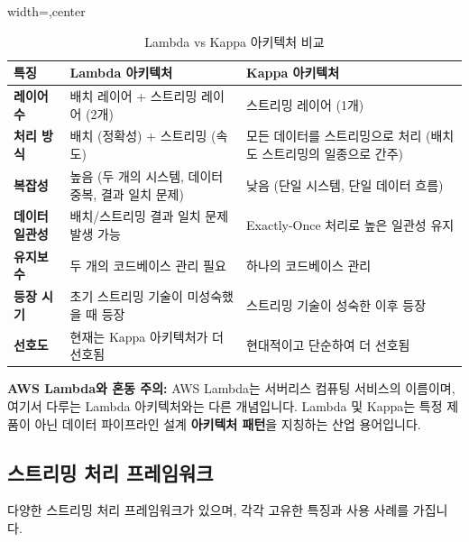 \documentclass[11pt,a4paper]{article}
\begin{document}
\begin{table}[htbp]
\centering
\caption{Lambda vs Kappa 아키텍처 비교}
\label{tab:lambda_vs_kappa}
\begin{adjustbox}{width=\textwidth,center}
\begin{tabular}{lll}
\toprule
\textbf{특징} & \textbf{Lambda 아키텍처} & \textbf{Kappa 아키텍처} \\
\midrule
\textbf{레이어 수} & 배치 레이어 + 스트리밍 레이어 (2개) & 스트리밍 레이어 (1개) \\
\textbf{처리 방식} & 배치 (정확성) + 스트리밍 (속도) & 모든 데이터를 스트리밍으로 처리 (배치도 스트리밍의 일종으로 간주) \\
\textbf{복잡성} & 높음 (두 개의 시스템, 데이터 중복, 결과 일치 문제) & 낮음 (단일 시스템, 단일 데이터 흐름) \\
\textbf{데이터 일관성} & 배치/스트리밍 결과 일치 문제 발생 가능 & Exactly-Once 처리로 높은 일관성 유지 \\
\textbf{유지보수} & 두 개의 코드베이스 관리 필요 & 하나의 코드베이스 관리 \\
\textbf{등장 시기} & 초기 스트리밍 기술이 미성숙했을 때 등장 & 스트리밍 기술이 성숙한 이후 등장 \\
\textbf{선호도} & 현재는 Kappa 아키텍처가 더 선호됨 & 현대적이고 단순하여 더 선호됨 \\
\bottomrule
\end{tabular}
\end{adjustbox}
\end{table}

\begin{warningbox}
\textbf{AWS Lambda와 혼동 주의:} AWS Lambda는 서버리스 컴퓨팅 서비스의 이름이며, 여기서 다루는 Lambda 아키텍처와는 다른 개념입니다. Lambda 및 Kappa는 특정 제품이 아닌 데이터 파이프라인 설계 \textbf{아키텍처 패턴}을 지칭하는 산업 용어입니다.
\end{warningbox}

\subsection{스트리밍 처리 프레임워크}

다양한 스트리밍 처리 프레임워크가 있으며, 각각 고유한 특징과 사용 사례를 가집니다.
\end{document}
